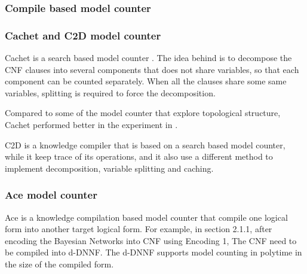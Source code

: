     \subsubsection{Compile based model counter}
    \subsubsection{Cachet and C2D model counter}
    Cachet is a search based model counter \cite{Cachet}. The idea behind is to decompose the CNF clauses into several components that does not share variables, so that each component can be counted separately. When all the clauses share some same variables, splitting is required to force the decomposition. \\\par
    Compared to some of the model counter that explore  topological structure, Cachet performed better in the experiment in \cite{2008}.\\\par
    C2D \cite{c2d} is a knowledge compiler that is based on a search based model counter, while it keep trace of its operations, and it also use a different method to implement decomposition, variable splitting and caching.
    \subsubsection{Ace model counter}
    Ace \cite{Ace} is a knowledge compilation based model counter that compile one logical form into another target logical form. For example, in section 2.1.1, after encoding the Bayesian Networks into CNF using Encoding 1, The CNF need to be compiled into d-DNNF. The d-DNNF supports model counting in polytime in the size of the compiled form.
    

